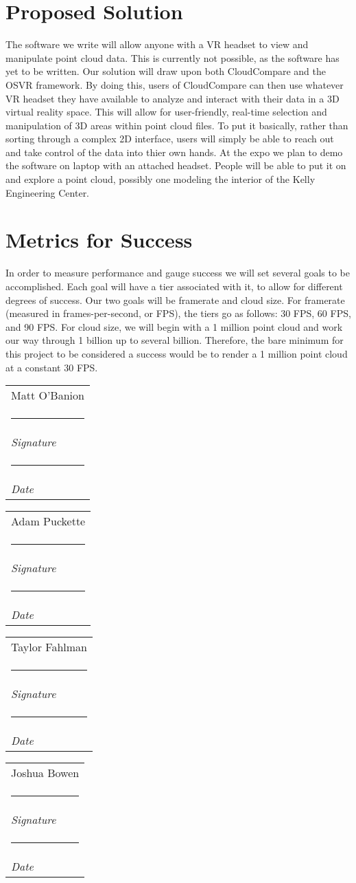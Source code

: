 \documentclass{article}
\makeatletter
\newcommand{\namesigdate}[2][5cm]{%
  \begin{tabular}{@{}p{#1}@{}}
    #2 \\[2\normalbaselineskip] \hrule \\[0pt]
    {\small \textit{Signature}} \\[2\normalbaselineskip] \hrule \\[0pt]
    {\small \textit{Date}}
  \end{tabular}
}
\makeatother
\begin{document}
\section*{Proposed Solution}

The software we write will allow anyone with a VR headset to view and manipulate point cloud data. This is currently not possible, as the software has yet to be written. Our solution will draw upon both CloudCompare and the OSVR framework. By doing this, users of CloudCompare can then use whatever VR headset they have available to analyze and interact with their data in a 3D virtual reality space. This will allow for user-friendly, real-time selection and manipulation of 3D areas within point cloud files. To put it basically, rather than sorting through a complex 2D interface, users will simply be able to reach out and take control of the data into thier own hands. At the expo we plan to demo the software on laptop with an attached headset. People will be able to put it on and explore a point cloud, possibly one modeling the interior of the Kelly Engineering Center. 

\section*{Metrics for Success}

In order to measure performance and gauge success we will set several goals to be accomplished. Each goal will have a tier associated with it, to allow for different degrees of success. Our two goals will be framerate and cloud size. For framerate (measured in frames-per-second, or FPS), the tiers go as follows: 30 FPS, 60 FPS, and 90 FPS. For cloud size, we will begin with a 1 million point cloud and work our way through 1 billion up to several billion. Therefore, the bare minimum for this project to be considered a success would be to render a 1 million point cloud at a constant 30 FPS. 

\vspace{2pc}

\noindent \namesigdate{Matt O'Banion} \hfill \namesigdate[3cm]{Adam Puckette}

\vspace{2pc}

\noindent \namesigdate{Taylor Fahlman} \hfill \namesigdate[3cm]{Joshua Bowen}
\end{document}
